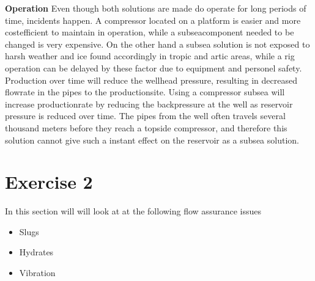 \documentclass[a4paper,norsk]{article}
\begin{document}
\textbf{Operation}
Even though both solutions are made do operate for long periods of time, incidents happen. A compressor located on a platform is easier and more costefficient to maintain in operation, while a subseacomponent needed to be changed is very expensive. On the other hand a subsea solution is not exposed to harsh weather and ice found accordingly in tropic and artic areas, while a rig operation can be delayed by these factor due to equipment and personel safety. \\
Production over time will reduce the wellhead pressure, resulting in decreased flowrate in the pipes to the productionsite. Using a compressor subsea will increase productionrate by reducing the backpressure at the well as reservoir pressure is reduced over time. The pipes from the well often travels several thousand meters before they reach a topside compressor, and therefore this solution cannot give such a instant effect on the reservoir as a subsea solution.

\section*{Exercise 2}
In this section will will look at at the following flow assurance issues
\begin{itemize}
\item Slugs
\item Hydrates
\item Vibration
\end{itemize}
\end{document}
